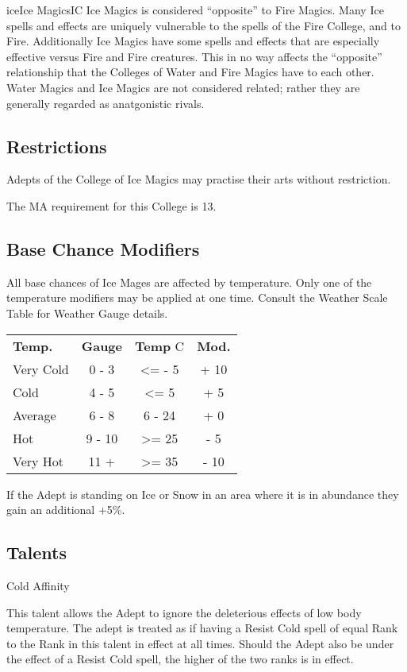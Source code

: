 \begin{college}[1.5]{ice}{Ice Magics}{IC}
Ice Magics is considered ``opposite'' to Fire Magics.  Many Ice spells
and effects are uniquely vulnerable to the spells of the Fire College,
and to Fire.  Additionally Ice Magics have some spells and effects
that are especially effective versus Fire and Fire creatures.  This in
no way affects the ``opposite'' relationship that the Colleges of Water
and Fire Magics have to each other.  Water Magics and Ice Magics are
not considered related; rather they are generally regarded as
anatgonistic rivals.

\subsection{Restrictions}

Adepts of the College of Ice Magics may practise their arts without
restriction.

The MA requirement for this College is 13.

\subsection{Base Chance Modifiers}
\label{ice:modifiers}
All base chances of Ice Mages are affected by temperature. Only one of
the temperature modifiers may be applied at one time.  Consult the
Weather Scale Table for Weather Gauge details.

\begin{tabular}{lccc}
\textbf{Temp.}	&\textbf{Gauge}&\textbf{Temp} \textdegree C&\textbf{Mod.} \\
Very Cold	&	0 - 3	& <= - 5	&	+ 10 \\
Cold		&	4 - 5	& <= 5		&	+ 5 \\
Average		&	6 - 8	& 6 - 24	&	+ 0 \\
Hot		&	9 - 10	& >= 25		&	- 5 \\
Very Hot	&	11 +	& >= 35		&	- 10 \\
\end{tabular}

If the Adept is standing on Ice or Snow in an area where it is in
abundance they gain an additional +5\%.

\subsection{Talents}

\begin{talent}[T-1]{Cold Affinity}

\begin{effects}
This talent allows the Adept to ignore the deleterious effects of low
body temperature.  The adept is treated as if having a Resist Cold
spell of equal Rank to the Rank in this talent in effect at all
times. Should the Adept also be under the effect of a Resist Cold
spell, the higher of the two ranks is in effect.


\end{effects}
\end{talent}
\end{college}
